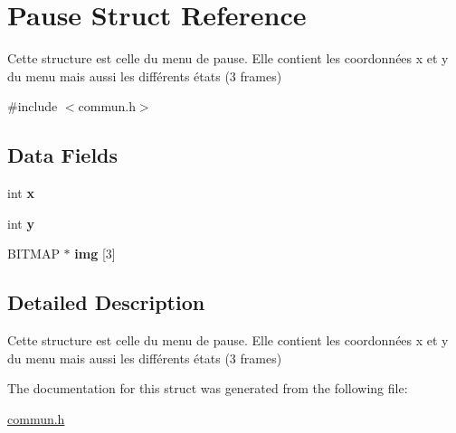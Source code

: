 \hypertarget{struct_pause}{\section{Pause Struct Reference}
\label{struct_pause}
}


Cette structure est celle du menu de pause. Elle contient les coordonnées x et y du menu mais aussi les différents états (3 frames)  




{\ttfamily \#include $<$commun.\-h$>$}

\subsection*{Data Fields}
\begin{DoxyCompactItemize}
\item 
\hypertarget{struct_pause_a6150e0515f7202e2fb518f7206ed97dc}{int {\bfseries x}}\label{struct_pause_a6150e0515f7202e2fb518f7206ed97dc}

\item 
\hypertarget{struct_pause_a0a2f84ed7838f07779ae24c5a9086d33}{int {\bfseries y}}\label{struct_pause_a0a2f84ed7838f07779ae24c5a9086d33}

\item 
\hypertarget{struct_pause_a99933deee119efe612d38cf6759af35e}{B\-I\-T\-M\-A\-P $\ast$ {\bfseries img} \mbox{[}3\mbox{]}}\label{struct_pause_a99933deee119efe612d38cf6759af35e}

\end{DoxyCompactItemize}


\subsection{Detailed Description}
Cette structure est celle du menu de pause. Elle contient les coordonnées x et y du menu mais aussi les différents états (3 frames) 


\begin{DoxyItemize}
\item 
\end{DoxyItemize}

The documentation for this struct was generated from the following file\-:\begin{DoxyCompactItemize}
\item 
\hyperlink{commun_8h}{commun.\-h}\end{DoxyCompactItemize}
